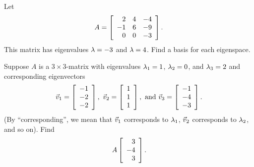 \documentclass{ximera}
\begin{document}
\begin{exercise}
  Let
  \begin{equation*}
    A = \startmat{rrr}
      2 &   4 &  -4 \\
      -1 &  6 &  -9 \\
      0 &   0 &  -3 \\
    \stopmat.
  \end{equation*}
  This matrix has eigenvalues $\eigenvar=-3$ and $\eigenvar=4$. Find a
  basis for each eigenspace.
\end{exercise}

\begin{exercise}
  Suppose $A$ is a $3\times 3$-matrix with eigenvalues
  $\eigenvar_1=1$, $\eigenvar_2=0$, and $\eigenvar_3=2$ and
  corresponding eigenvectors
  \begin{equation*}
    \vect{v}_1 = \startmat{r}
      -1 \\
      -2 \\
      -2
    \stopmat,
    \quad
    \vect{v}_2 = \startmat{r}
      1 \\
      1 \\
      1
    \stopmat,
    \quad\mbox{and}\quad
    \vect{v}_3 = \startmat{r}
      -1 \\
      -4 \\
      -3
    \stopmat.
  \end{equation*}
  (By ``corresponding'', we mean that $\vect{v}_1$ corresponds to
  $\eigenvar_1$, $\vect{v}_2$ corresponds to $\eigenvar_2$, and so
  on).  Find
  \begin{equation*}
    A\startmat{r}
      3 \\
      -4 \\
      3
    \stopmat.
  \end{equation*}
\end{exercise}
\end{document}
